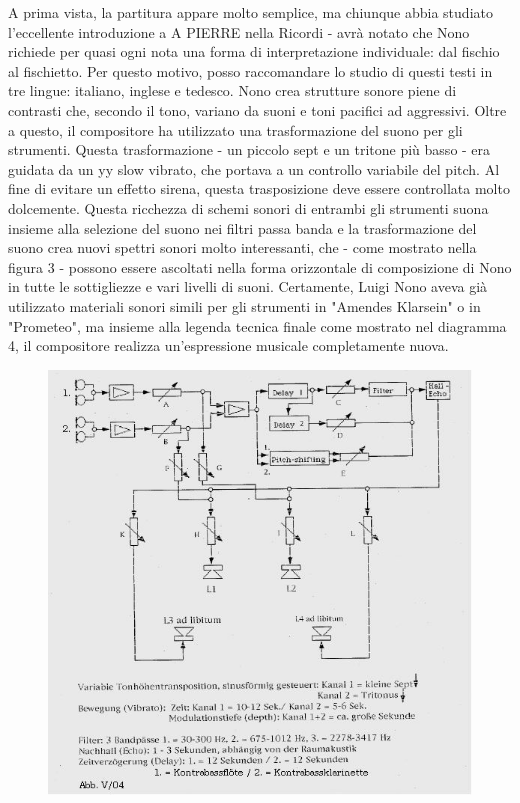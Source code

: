A prima vista, la partitura appare molto semplice, ma chiunque abbia studiato l'eccellente introduzione a A PIERRE nella Ricordi - avrà notato che Nono richiede per quasi ogni nota una forma di interpretazione individuale: dal fischio al fischietto. Per questo motivo, posso raccomandare lo studio di questi testi in tre lingue: italiano, inglese e tedesco. 
Nono crea strutture sonore piene di contrasti che, secondo il tono, variano da suoni e toni pacifici ad aggressivi. Oltre a questo, il compositore ha utilizzato una trasformazione del suono per gli strumenti. Questa trasformazione - un piccolo sept e un tritone più basso - era guidata da un yy slow vibrato, che portava a un controllo variabile del pitch. Al fine di evitare un effetto sirena, questa trasposizione deve essere controllata molto dolcemente. Questa ricchezza di schemi sonori di entrambi gli strumenti suona insieme alla selezione del suono nei filtri passa banda e la trasformazione del suono crea nuovi spettri sonori molto interessanti, che - come mostrato nella figura 3 - possono essere ascoltati nella forma orizzontale di composizione di Nono in tutte le sottigliezze e vari livelli di suoni. 
Certamente, Luigi Nono aveva già utilizzato materiali sonori simili per gli strumenti in "Amendes Klarsein" o in "Prometeo", ma insieme alla legenda tecnica finale come mostrato nel diagramma 4, il compositore realizza un'espressione musicale completamente nuova. 

\begin{figure}[htbp]
\begin{center}
\includegraphics[width=1\textwidth]{images/nono/hph/ab_v_04.jpg}
\caption{}
\label{hph-img4}
\end{center}
\end{figure}

